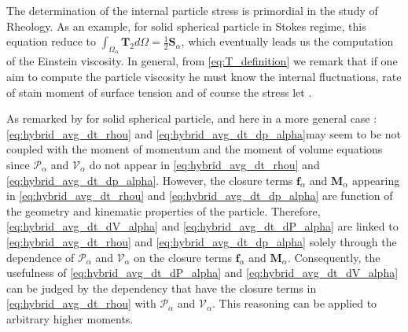 The determination of the internal particle stress is primordial in the study of Rheology.
As an example, for solid spherical particle in Stokes regime, this equation reduce to $ \int_{\Omega_\alpha}\mathbf{T}_2d\Omega = \frac{1}{2}\textbf{S}_\alpha$, which eventually leads us the computation of the Einstein viscosity. 
In general, from \ref{eq:T_definition} we remark that if one aim to compute the particle viscosity he must know the internal fluctuations, rate of stain moment of surface tension  and of course the stress let . 


As remarked by \citet{jackson1997locally} for solid spherical particle, and here in a more general case :\ref{eq:hybrid_avg_dt_rhou} and \ref{eq:hybrid_avg_dt_dp_alpha}may seem to be not coupled with the moment of momentum and the moment of volume equations since $\mathcal{P}_\alpha$ and $\mathcal{V}_\alpha$ do not appear in \ref{eq:hybrid_avg_dt_rhou} and \ref{eq:hybrid_avg_dt_dp_alpha}.
However, the closure terms $\textbf{f}_\alpha$ and $\textbf{M}_\alpha$ appearing in \ref{eq:hybrid_avg_dt_rhou} and \ref{eq:hybrid_avg_dt_dp_alpha} are function of the geometry and kinematic properties of the particle. 
Therefore,  \ref{eq:hybrid_avg_dt_dV_alpha} and \ref{eq:hybrid_avg_dt_dP_alpha} are linked to \ref{eq:hybrid_avg_dt_rhou} and \ref{eq:hybrid_avg_dt_dp_alpha} solely through the dependence of $\mathcal{P}_\alpha$ and $\mathcal{V}_\alpha$ on the closure terms  $\textbf{f}_\alpha$ and $\textbf{M}_\alpha$. 
Consequently, the usefulness of \ref{eq:hybrid_avg_dt_dP_alpha} and \ref{eq:hybrid_avg_dt_dV_alpha} can be judged by the dependency that have the closure terms in \ref{eq:hybrid_avg_dt_rhou} with $\mathcal{P}_\alpha$ and $\mathcal{V}_\alpha$. 
This reasoning can be applied to arbitrary higher moments. 
